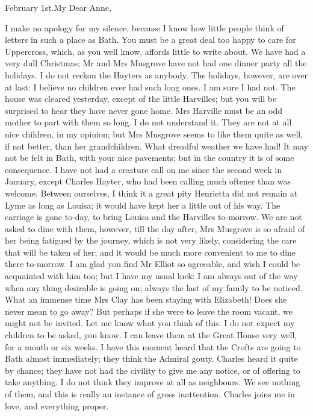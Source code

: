 \begin{mail}{February 1st.}{My Dear Anne,}

I make no apology for my silence, because I know how little people think of letters in such a place as Bath. You must be a great deal too happy to care for Uppercross, which, as you well know, affords little to write about. We have had a very dull Christmas; Mr and Mrs Musgrove have not had one dinner party all the holidays. I do not reckon the Hayters as anybody. The holidays, however, are over at last: I believe no children ever had such long ones. I am sure I had not. The house was cleared yesterday, except of the little Harvilles; but you will be surprised to hear they have never gone home. Mrs Harville must be an odd mother to part with them so long. I do not understand it. They are not at all nice children, in my opinion; but Mrs Musgrove seems to like them quite as well, if not better, than her grandchildren. What dreadful weather we have had! It may not be felt in Bath, with your nice pavements; but in the country it is of some consequence. I have not had a creature call on me since the second week in January, except Charles Hayter, who had been calling much oftener than was welcome. Between ourselves, I think it a great pity Henrietta did not remain at Lyme as long as Louisa; it would have kept her a little out of his way. The carriage is gone to-day, to bring Louisa and the Harvilles to-morrow. We are not asked to dine with them, however, till the day after, Mrs Musgrove is so afraid of her being fatigued by the journey, which is not very likely, considering the care that will be taken of her; and it would be much more convenient to me to dine there to-morrow. I am glad you find Mr Elliot so agreeable, and wish I could be acquainted with him too; but I have my usual luck: I am always out of the way when any thing desirable is going on; always the last of my family to be noticed. What an immense time Mrs Clay has been staying with Elizabeth! Does she never mean to go away? But perhaps if she were to leave the room vacant, we might not be invited. Let me know what you think of this. I do not expect my children to be asked, you know. I can leave them at the Great House very well, for a month or six weeks. I have this moment heard that the Crofts are going to Bath almost immediately; they think the Admiral gouty. Charles heard it quite by chance; they have not had the civility to give me any notice, or of offering to take anything. I do not think they improve at all as neighbours. We see nothing of them, and this is really an instance of gross inattention. Charles joins me in love, and everything proper. 

\end{mail}


